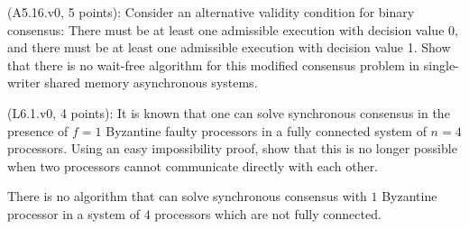 \begin{Exc}{(A5.16.v0, 5 points):}
Consider an alternative validity condition for binary consensus: There must
be at least one admissible execution with decision value 0, and there
must be at least one admissible execution with decision value 1.
Show that there is no wait-free algorithm for this modified consensus
problem in single-writer shared memory asynchronous systems.
\end{Exc}



\begin{Exc}{(L6.1.v0, 4 points):}
It is known that one can solve synchronous consensus
in the presence of $f=1$ Byzantine faulty processors
in a fully connected system of $n=4$ processors. Using an easy
impossibility proof, show that this is no longer possible when
two processors cannot communicate directly with each other.
\end{Exc}

\begin{theorem}
There is no algorithm that can solve synchronous consensus with $1$ Byzantine
processor in a system of $4$ processors which are not fully connected.
\end{theorem}

